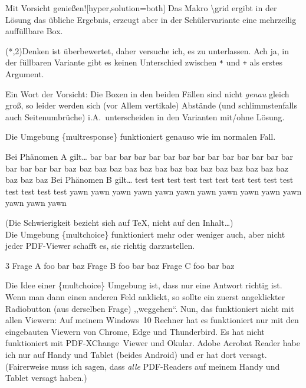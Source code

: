 \documentclass[hyperworksheet,pgfplots]{drcschool}
\newcommand*{\cs}[1]{\textup{\ttfamily\textbackslash#1}}                   %
\newcommand*{\env}[1]{\textup{\ttfamily\{#1\}}}                            %
\begin{document}
\begin{worksheet}{Mit Vorsicht genießen!}[hyper,solution=both]
\exercise[Grids]
Das Makro \cs{grid} ergibt in der Lösung das übliche Ergebnis, erzeugt aber in der Schülervariante
eine mehrzeilig auf{}füllbare Box.

\grid(*,2){Denken ist überbewertet, daher versuche ich, es zu unterlassen. Ach ja, in der füllbaren Variante gibt es keinen
Unterschied zwischen \texttt{*} und \texttt{+} als erstes Argument.}

\noindent
Ein Wort der Vorsicht: Die Boxen in den beiden Fällen sind nicht \emph{genau}
gleich groß, so leider werden
sich (vor Allem vertikale) Abstände (und schlimmstenfalls auch Seitenumbrüche) i.A.~unterscheiden
in den Varianten mit/ohne Lösung.

\easy{}
Die Umgebung \env{multresponse} funktioniert genauso wie im normalen Fall.
\begin{multresponse}
\question Bei Phänomen A gilt\ldots
\choice* bar bar bar bar bar bar bar bar bar bar bar bar bar bar bar bar bar bar
\choice* baz baz baz baz baz baz baz baz baz baz baz baz baz baz baz baz baz baz
\question Bei Phänomen B gilt\ldots
\choice* test test test test test test test test test test test test test test
\choice yawn yawn yawn yawn yawn yawn yawn yawn yawn yawn yawn yawn yawn yawn
\end{multresponse}

\hard{}
(Die Schwierigkeit bezieht sich auf \TeX, nicht auf den Inhalt\ldots)\\
Die Umgebung \env{multchoice} funktioniert
mehr oder weniger auch, aber nicht jeder PDF-Viewer schafft es, sie
richtig darzustellen.
\begin{multchoice*}{3}
\question Frage A
\choice foo
\choice* bar
\choice baz
\question Frage B
\choice foo
\choice bar
\choice* baz
\question Frage C
\choice* foo
\choice bar
\choice baz
\end{multchoice*}
Die Idee einer \env{multchoice} Umgebung ist, dass nur eine Antwort richtig
ist. Wenn man dann einen anderen Feld anklickt, so sollte ein zuerst angeklickter
Radiobutton (aus derselben Frage) ,,weggehen``. Nun, das funktioniert nicht mit
allen Viewern: Auf meinem Windows~10 Rechner hat es funktioniert nur mit den
eingebauten Viewern von Chrome, Edge und Thunderbird. Es hat nicht funktioniert
mit PDF-XChange~Viewer und Okular. Adobe Acrobat Reader habe ich nur auf Handy
und Tablet (beides Android) und er hat dort versagt. (Fairerweise muss ich sagen,
dass \emph{alle} PDF-Readers auf meinem Handy und Tablet versagt haben.)


\end{worksheet}
\end{document}
